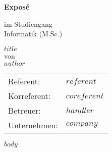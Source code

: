\documentclass[ngerman,]{article}
\author{$author$}
\date{}
\begin{document}
\begin{titlepage}
    \begin{minipage}[t]{0.5\textwidth}
        \begin{large}
            \begin{flushleft}
              \hspace{1cm} 
            \end{flushleft}
        \end{large}
    \end{minipage}
    \begin{minipage}[t]{0.5\textwidth}
        \begin{large}
            \begin{flushright}
              \hspace{1cm}
            \end{flushright}
        \end{large}
    \end{minipage}
    \vspace{0.07\textheight}
    \begin{center}
        \begin{huge}
            \textbf{Exposé}\\
        \end{huge}
        \vspace{0.04\textheight}
        \begin{large}
            im Studiengang \\
            Informatik (M.Sc.)\\
        \end{large}
    \end{center}
    \vspace{0.10\textheight}
    \begin{center}
        \begin{large}
            $title$\\
            von\\
           $author$\\
        \end{large}
    \end{center}
    \begin{large}
        \begin{flushleft}
            \vfill
            \begin{tabularx}{\textwidth}{lX}
                Referent: & $referent$\\
                Korreferent: & $coreferent$\\
                Betreuer: & $handler$\\
                Unternehmen: & $company$\\
            \end{tabularx}
        \end{flushleft}
    \end{large}
\end{titlepage}

$body$
\end{document}
